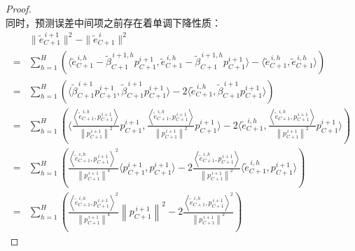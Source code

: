 \begin{proof}
$$$$
同时，预测误差中间项之前存在着单调下降性质：
\begin{align*}
    & \|\tilde{e}_{C+1}^{\, i+1}\|^2-\|\tilde{e}_{C+1}^{\, i}\|^2 \\
    ={}    & \sum_{h=1}^{H}
    \left(
    \langle \tilde{e}_{C+1}^{\, i,h}-\tilde{\beta}_{C+1}^{\, i+1,h} p_{C+1}^{i+1}
    ,
    \tilde{e}_{C+1}^{\, i,h}-\tilde{\beta}_{C+1}^{\, i+1,h} p_{C+1}^{i+1} \rangle
    -
    \langle \tilde{e}_{C+1}^{\, i,h}, \tilde{e}_{C+1}^{\, i,h} \rangle
    \right)                                                              \\
    ={}    & \sum_{h=1}^{H}
    \left(
    \langle \tilde{\beta}_{C+1}^{\, i+1} p_{C+1}^{i+1}
    ,
    \tilde{\beta}_{C+1}^{\, i+1} p_{C+1}^{i+1} \rangle
    -
    2 \langle \tilde{e}_{C+1}^{\, i,h} , \tilde{\beta}_{C+1}^{\, i+1} p_{C+1}^{i+1} \rangle
    \right)                                                              
    \\
    ={}    & \sum_{h=1}^{H}
    \left(
    \langle 
    \frac{\left\langle \tilde{e}_{C+1}^{\, i,h}, p_{C+1}^{\, i+1}\right\rangle}{\left\|p_{C+1}^{\, i+1}\right\|^{2}}  
    p_{C+1}^{i+1}
    ,
    \frac{\left\langle \tilde{e}_{C+1}^{\, i,h}, p_{C+1}^{\, i+1}\right\rangle}{\left\|p_{C+1}^{\, i+1}\right\|^{2}}  
    p_{C+1}^{i+1}
    \rangle
    -
    2 
    \langle 
    \tilde{e}_{C+1}^{\, i,h} 
    ,
    \frac{\left\langle \tilde{e}_{C+1}^{\, i,h}, p_{C+1}^{\, i+1}\right\rangle}{\left\|p_{C+1}^{\, i+1}\right\|^{2}}  
    p_{C+1}^{i+1} 
    \rangle
    \right)                                                              
    \\
    ={}    & \sum_{h=1}^{H}
    \left(
    \frac{{\left\langle \tilde{e}_{C+1}^{\, i,h}, p_{C+1}^{\, i+1}\right\rangle}^2}{\left\|p_{C+1}^{\, i+1}\right\|^{4}}  
    \langle 
    p_{C+1}^{i+1}
    ,
    p_{C+1}^{i+1}
    \rangle
    -
    2 \frac{\left\langle \tilde{e}_{C+1}^{\, i,h}, p_{C+1}^{\, i+1}\right\rangle}{\left\|p_{C+1}^{\, i+1}\right\|^{2}}  
    \langle \tilde{e}_{C+1}^{\, i,h} 
    ,
    p_{C+1}^{i+1} 
    \rangle
    \right)                                                              
    \\
    ={}    & \sum_{h=1}^{H}
    \left(
    \frac{{\left\langle \tilde{e}_{C+1}^{\, i,h}, p_{C+1}^{\, i+1}\right\rangle}^2}{\left\|p_{C+1}^{\, i+1}\right\|^{4}}  
    {\left\|p_{C+1}^{\, i+1}\right\|^{2}}  
    -
    2 \frac{{\left\langle \tilde{e}_{C+1}^{\, i,h}, p_{C+1}^{\, i+1}\right\rangle}^2}{\left\|p_{C+1}^{\, i+1}\right\|^{2}}  
    \right)                                                              

\end{align*}
\end{proof}
